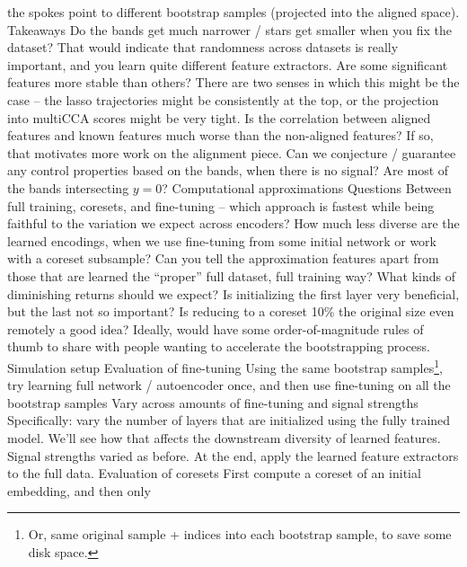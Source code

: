 \documentclass[11pt]{article}
\begin{document}
\begin{outline}
        the spokes point to different bootstrap samples (projected into the
        aligned space).
      \3 Takeaways
        \4 Do the bands get much narrower / stars get smaller when you fix the
        dataset? That would indicate that randomness across datasets is really
        important, and you learn quite different feature extractors.
        \4 Are some significant features more stable than others? There are two
        senses in which this might be the case -- the lasso trajectories might
        be consistently at the top, or the projection into multiCCA scores might
        be very tight.
        \4 Is the correlation between aligned features and known features much
        worse than the non-aligned features? If so, that motivates more work on
        the alignment piece.
        \4 Can we conjecture / guarantee any control properties based on the
        bands, when there is no signal? Are most of the bands intersecting $y =
        0$?
  \1 Computational approximations
    \2 Questions
      \3 Between full training, coresets, and fine-tuning -- which approach is
      fastest while being faithful to the variation we expect across encoders?
      \3 How much less diverse are the learned encodings, when we use
      fine-tuning from some initial network or work with a coreset subsample?
      \3 Can you tell the approximation features apart from those that are
      learned the ``proper'' full dataset, full training way?
      \3 What kinds of diminishing returns should we expect? Is initializing the
      first layer very beneficial, but the last not so important? Is reducing to
      a coreset 10\% the original size even remotely a good idea? Ideally, would
      have some order-of-magnitude rules of thumb to share with people wanting
      to accelerate the bootstrapping process.
    \2 Simulation setup
      \3 Evaluation of fine-tuning
        \4 Using the same bootstrap samples\footnote{Or, same original sample +
          indices into each bootstrap sample, to save some disk space.}, try
        learning full network / autoencoder once, and then use fine-tuning on
        all the bootstrap samples
        \4 Vary across amounts of fine-tuning and signal strengths
        \4 Specifically: vary the number of layers that are initialized using
        the fully trained model. We'll see how that affects the downstream
        diversity of learned features. Signal strengths varied as before.
        \4 At the end, apply the learned feature extractors to the full data.
      \3 Evaluation of coresets
        \4 First compute a coreset of an initial embedding, and then only

\end{outline}
\end{document}
